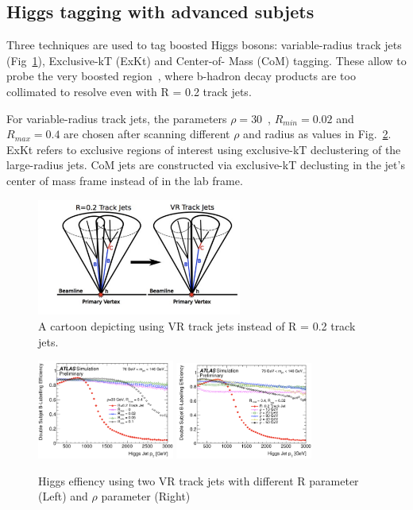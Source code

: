 \subsection{Higgs tagging with advanced subjets}

\par Three techniques are used to tag boosted Higgs bosons: variable-radius track jets (Fig~\ref{fig:vr}), Exclusive-kT (ExKt) and Center-of- Mass (CoM) tagging. These allow to probe the very boosted region~\cite{ATL-PHYS-PUB-2017-010}, where b-hadron decay products are too collimated to resolve even with R = 0.2 track jets.
\par For variable-radius track jets, the parameters $\rho = 30$~\GeV, $R_{min} = 0.02$ and $R_{max} = 0.4$ 
are chosen after scanning different $\rho$ and radius as values in Fig.~\ref{fig:vr-scan}. ExKt refers to exclusive regions of interest using exclusive-kT declustering of the large-radius jets. 
CoM jets are constructed via exclusive-kT declusting in the jet's center of mass frame instead of in the lab frame.

\begin{figure}[htbp]
    \centering
    \includegraphics[width=0.6\textwidth]{chapters/c5/figures/VR}
    \caption{A cartoon depicting using VR track jets instead of R = 0.2 track jets.}
    \label{fig:vr}
\end{figure}

\begin{figure}[htbp]
    \centering
    \includegraphics[width=0.4\textwidth]{chapters/c5/figures/r-vr}
    \includegraphics[width=0.4\textwidth]{chapters/c5/figures/rho-vr}
    \caption{Higgs effiency using two VR track jets with different R parameter (Left) and $\rho$ parameter (Right)} 
    \label{fig:vr-scan}
\end{figure}

